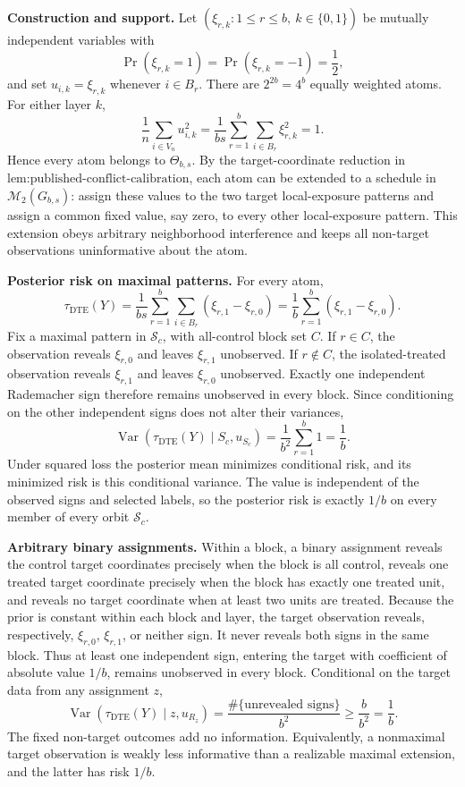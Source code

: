\textbf{Construction and support.}
Let \((\xi_{r,k}:1\leq r\leq b,\ k\in\{0,1\})\) be mutually independent variables with
\[
\Pr(\xi_{r,k}=1)=\Pr(\xi_{r,k}=-1)=\frac12,
\]
and set \(u_{i,k}=\xi_{r,k}\) whenever \(i\in B_r\). There are \(2^{2b}=4^b\) equally weighted atoms. For either layer \(k\),
\[
\frac1n\sum_{i\in V_n}u_{i,k}^2
=\frac1{bs}\sum_{r=1}^b\sum_{i\in B_r}\xi_{r,k}^2
=1.
\]
Hence every atom belongs to \(\Theta_{b,s}\). By the target-coordinate reduction in \(\text{lem:published-conflict-calibration}\), each atom can be extended to a schedule in \(\mathcal M_2(G_{b,s})\): assign these values to the two target local-exposure patterns and assign a common fixed value, say zero, to every other local-exposure pattern. This extension obeys arbitrary neighborhood interference and keeps all non-target observations uninformative about the atom.

\textbf{Posterior risk on maximal patterns.}
For every atom,
\[
\tau_{\mathrm{DTE}}(Y)
=\frac1{bs}\sum_{r=1}^b\sum_{i\in B_r}(\xi_{r,1}-\xi_{r,0})
=\frac1b\sum_{r=1}^b(\xi_{r,1}-\xi_{r,0}).
\]
Fix a maximal pattern in \(\mathcal S_c\), with all-control block set \(C\). If \(r\in C\), the observation reveals \(\xi_{r,0}\) and leaves \(\xi_{r,1}\) unobserved. If \(r\notin C\), the isolated-treated observation reveals \(\xi_{r,1}\) and leaves \(\xi_{r,0}\) unobserved. Exactly one independent Rademacher sign therefore remains unobserved in every block. Since conditioning on the other independent signs does not alter their variances,
\[
\operatorname{Var}\!\left(\tau_{\mathrm{DTE}}(Y)\mid S_c,u_{S_c}\right)
=\frac1{b^2}\sum_{r=1}^b1
=\frac1b.
\]
Under squared loss the posterior mean minimizes conditional risk, and its minimized risk is this conditional variance. The value is independent of the observed signs and selected labels, so the posterior risk is exactly \(1/b\) on every member of every orbit \(\mathcal S_c\).

\textbf{Arbitrary binary assignments.}
Within a block, a binary assignment reveals the control target coordinates precisely when the block is all control, reveals one treated target coordinate precisely when the block has exactly one treated unit, and reveals no target coordinate when at least two units are treated. Because the prior is constant within each block and layer, the target observation reveals, respectively, \(\xi_{r,0}\), \(\xi_{r,1}\), or neither sign. It never reveals both signs in the same block. Thus at least one independent sign, entering the target with coefficient of absolute value \(1/b\), remains unobserved in every block. Conditional on the target data from any assignment \(z\),
\[
\operatorname{Var}\!\left(\tau_{\mathrm{DTE}}(Y)\mid z,u_{R_z}\right)
=\frac{\#\{\text{unrevealed signs}\}}{b^2}
\geq\frac b{b^2}
=\frac1b.
\]
The fixed non-target outcomes add no information. Equivalently, a nonmaximal target observation is weakly less informative than a realizable maximal extension, and the latter has risk \(1/b\).

